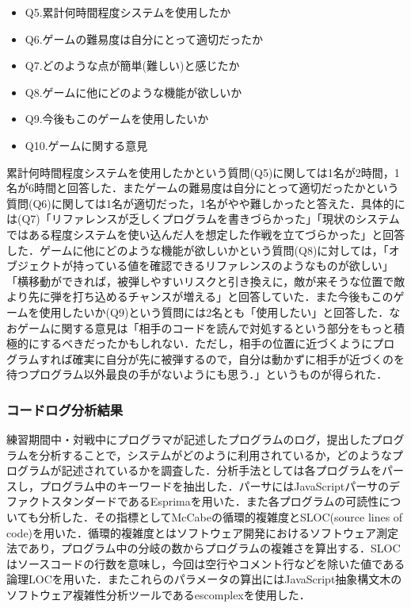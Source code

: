 \begin{itemize}
  \item Q5.累計何時間程度システムを使用したか
  \item Q6.ゲームの難易度は自分にとって適切だったか
  \item Q7.どのような点が簡単(難しい)と感じたか
  \item Q8.ゲームに他にどのような機能が欲しいか
  \item Q9.今後もこのゲームを使用したいか
  \item Q10.ゲームに関する意見
\end{itemize}

累計何時間程度システムを使用したかという質問(Q5)に関しては1名が2時間，1名が6時間と回答した．またゲームの難易度は自分にとって適切だったかという質問(Q6)に関しては1名が適切だった，1名がやや難しかったと答えた．具体的には(Q7)「リファレンスが乏しくプログラムを書きづらかった」「現状のシステムではある程度システムを使い込んだ人を想定した作戦を立てづらかった」と回答した．ゲームに他にどのような機能が欲しいかという質問(Q8)に対しては，「オブジェクトが持っている値を確認できるリファレンスのようなものが欲しい」「横移動ができれば，被弾しやすいリスクと引き換えに，敵が来そうな位置で敵より先に弾を打ち込めるチャンスが増える」と回答していた．また今後もこのゲームを使用したいか(Q9)という質問には2名とも「使用したい」と回答した．なおゲームに関する意見は「相手のコードを読んで対処するという部分をもっと積極的にするべきだったかもしれない．ただし，相手の位置に近づくようにプログラムすれば確実に自分が先に被弾するので，自分は動かずに相手が近づくのを待つプログラム以外最良の手がないようにも思う．」というものが得られた．

\subsubsection{コードログ分析結果}

練習期間中・対戦中にプログラマが記述したプログラムのログ，提出したプログラムを分析することで，システムがどのように利用されているか，どのようなプログラムが記述されているかを調査した．分析手法としては各プログラムをパースし，プログラム中のキーワードを抽出した．パーサにはJavaScriptパーサのデファクトスタンダードであるEsprima\cite{esprima}を用いた．また各プログラムの可読性についても分析した．その指標としてMcCabeの循環的複雑度\cite{complexity}とSLOC(source lines of code)を用いた．循環的複雑度とはソフトウェア開発におけるソフトウェア測定法であり，プログラム中の分岐の数からプログラムの複雑さを算出する．SLOCはソースコードの行数を意味し，今回は空行やコメント行などを除いた値である論理LOCを用いた．またこれらのパラメータの算出にはJavaScript抽象構文木のソフトウェア複雑性分析ツールであるescomplex\cite{escomplex}を使用した．

